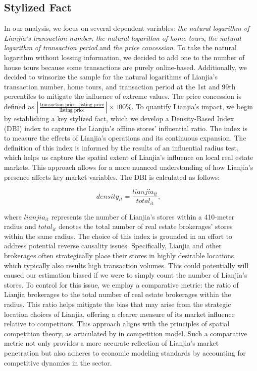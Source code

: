 \documentclass[11pt]{article}
\begin{document}
\subsection{Stylized Fact} \label{subsec:stylized_fact}

In our analysis, we focus on several dependent variables: \emph{the natural logarithm of Lianjia's transaction number}, \emph{the natural logarithm of home tours}, \emph{the natural logarithm of transaction period} and \emph{the price concession}. To take the natural logarithm without lossing information, we decided to add one to the number of house tours because some transactions are purely online-based. Additionally, we decided to winsorize the sample for the natural logarithms of Lianjia's transaction number, home tours, and transaction period at the 1st and 99th percentiles to mitigate the influence of extreme values. The price concession is defined as $|\frac{\text{transaction price} - \text{listing price}}{\text{listing price}}| \times 100\%$. To quantify Lianjia's impact, we begin by establishing a key stylized fact, which we develop a Density-Based Index (DBI) index to capture the Lianjia's offline stores' influential ratio. The index is to measure the effects of Lianjia's operations and its continuous expansion. The definition of this index is informed by the results of an influential radius test, which helps us capture the spatial extent of Lianjia's influence on local real estate markets. This approach allows for a more nuanced understanding of how Lianjia's presence affects key market variables. The DBI is calculated as follows:

\begin{equation*}
  density_{it} = \frac{lianjia_{it}}{total_{it}},
\end{equation*}

where $lianjia_{it}$ represents the number of Lianjia's stores within a 410-meter radius and $total_{it}$ denotes the total number of real estate brokerages' stores within the same radius. The choice of this index is grounded in an effort to address potential reverse causality issues. Specifically, Lianjia and other brokerages often strategically place their stores in highly desirable locations, which typically also results high transaction volumes. This could potentially will caused our estimation biased if we were to simply count the number of Lianjia's stores. To control for this issue, we employ a comparative metric: the ratio of Lianjia brokerages to the total number of real estate brokerages within the radius. This ratio helps mitigate the bias that may arise from the strategic location choices of Lianjia, offering a clearer measure of its market influence relative to competitors. This approach aligns with the principles of spatial competition theory, as articulated by \citep{hotelling_stability_1929, daspremont_hotellings_1979} in competition model. Such a comparative metric not only provides a more accurate reflection of Lianjia's market penetration but also adheres to economic modeling standards by accounting for competitive dynamics in the sector.
\end{document}

